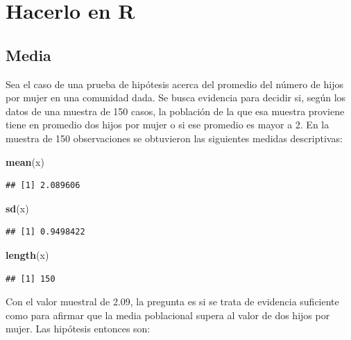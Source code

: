 \documentclass[]{book}
\newenvironment{Shaded}{\begin{snugshade}}{\end{snugshade}}
\newcommand{\KeywordTok}[1]{\textcolor[rgb]{0.13,0.29,0.53}{\textbf{#1}}}
\newcommand{\NormalTok}[1]{#1}
\begin{document}
\hypertarget{hacerlo-en-r-8}{%
\section{Hacerlo en R}\label{hacerlo-en-r-8}}

\hypertarget{media}{%
\subsection{Media}\label{media}}

Sea el caso de una prueba de hipótesis acerca del promedio del número de hijos por mujer en una comunidad dada. Se busca evidencia para decidir si, según los datos de una muestra de 150 casos, la población de la que esa muestra proviene tiene en promedio dos hijos por mujer o si ese promedio es mayor a 2. En la muestra de 150 observaciones se obtuvieron las siguientes medidas descriptivas:

\begin{Shaded}
\begin{Highlighting}[]
\KeywordTok{mean}\NormalTok{(x)}
\end{Highlighting}
\end{Shaded}

\begin{verbatim}
## [1] 2.089606
\end{verbatim}

\begin{Shaded}
\begin{Highlighting}[]
\KeywordTok{sd}\NormalTok{(x)}
\end{Highlighting}
\end{Shaded}

\begin{verbatim}
## [1] 0.9498422
\end{verbatim}

\begin{Shaded}
\begin{Highlighting}[]
\KeywordTok{length}\NormalTok{(x)}
\end{Highlighting}
\end{Shaded}

\begin{verbatim}
## [1] 150
\end{verbatim}

Con el valor muestral de 2.09, la pregunta es si se trata de evidencia suficiente como para afirmar que la media poblacional supera al valor de dos hijos por mujer.
Las hipótesis entonces son:
\end{document}

